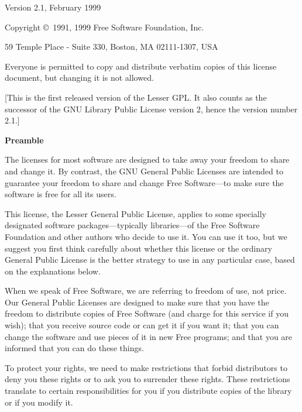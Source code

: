 \documentclass[11pt, letterpaper]{book}
\begin{document}
\begin{center}
{\parindent 0in

Version 2.1, February 1999

Copyright \copyright\ 1991, 1999 Free Software Foundation, Inc.

\bigskip

59 Temple Place - Suite 330, Boston, MA  02111-1307, USA

\bigskip

Everyone is permitted to copy and distribute verbatim copies
of this license document, but changing it is not allowed.

\bigskip

[This is the first released version of the Lesser GPL. It also counts
 as the successor of the GNU Library Public License version 2, hence
 the version number 2.1.]
}

\end{center}

\begin{center}
{\bf\large Preamble}
\end{center}

The licenses for most software are designed to take away your freedom to
share and change it. By contrast, the GNU General Public Licenses are
intended to guarantee your freedom to share and change Free Software---to
make sure the software is free for all its users.

This license, the Lesser General Public License, applies to some specially
designated software packages---typically libraries---of the Free Software
Foundation and other authors who decide to use it. You can use it too,
but we suggest you first think carefully about whether this license or the
ordinary General Public License is the better strategy to use in any
particular case, based on the explanations below.

When we speak of Free Software, we are referring to freedom of use, not
price. Our General Public Licenses are designed to make sure that you
have the freedom to distribute copies of Free Software (and charge for
this service if you wish); that you receive source code or can get it if
you want it; that you can change the software and use pieces of it in new
Free programs; and that you are informed that you can do these things.

To protect your rights, we need to make restrictions that forbid
distributors to deny you these rights or to ask you to surrender these
rights. These restrictions translate to certain responsibilities for you
if you distribute copies of the library or if you modify it.
\end{document}
